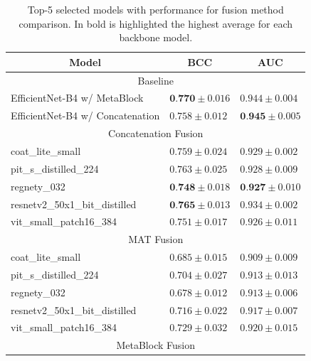 \documentclass[conference]{IEEEtran}
\begin{document}
\begin{table}
\centering
\caption{Top-5 selected models with performance for fusion method comparison. In bold is highlighted the highest average for each backbone model.}
\label{table:top5_fusion}
\begin{tabular}{l|l|l} 
\toprule
\multicolumn{1}{c|}{\textbf{Model}} & \multicolumn{1}{c|}{\textbf{BCC}}  & \multicolumn{1}{c}{\textbf{AUC}}    \\ 
\hline
\multicolumn{3}{c}{Baseline \cite{pacheco2020impact}}                                                                                   \\ 
\hline
EfficientNet-B4 w/ MetaBlock        & $\textbf{0.770} \pm 0.016$                  & $0.944 \pm 0.004$                   \\
EfficientNet-B4 w/ Concatenation    & $0.758 \pm 0.012$                  & $\textbf{0.945} \pm 0.005$                   \\ 
\hline
\multicolumn{3}{c}{Concatenation Fusion}                                                                       \\ 
\hline
coat\_lite\_small                   & $0.759 \pm 0.024$ & $0.929 \pm 0.002$  \\
pit\_s\_distilled\_224              & $0.763 \pm 0.025$ & $0.928 \pm 0.009$  \\
regnety\_032                        & $\textbf{0.748} \pm 0.018$ & $\textbf{0.927} \pm 0.010$  \\
resnetv2\_50x1\_bit\_distilled      & $\textbf{0.765} \pm 0.013$ & $0.934 \pm 0.002$  \\
vit\_small\_patch16\_384            & $0.751 \pm 0.017$ & $0.926 \pm 0.011$  \\ 
\hline
\multicolumn{3}{c}{MAT Fusion}                                                                                 \\ 
\hline
coat\_lite\_small                   & $0.685 \pm 0.015$ & $0.909 \pm 0.009$  \\
pit\_s\_distilled\_224              & $0.704 \pm 0.027$ & $0.913 \pm 0.013$  \\
regnety\_032                        & $0.678 \pm 0.012$ & $0.913 \pm 0.006$  \\
resnetv2\_50x1\_bit\_distilled      & $0.716 \pm 0.022$ & $0.917 \pm 0.007$  \\
vit\_small\_patch16\_384            & $0.729 \pm 0.032$ & $0.920 \pm 0.015$  \\ 
\hline
\multicolumn{3}{c}{MetaBlock Fusion}                                                                           \\ 

\end{tabular}
\end{table}
\end{document}

